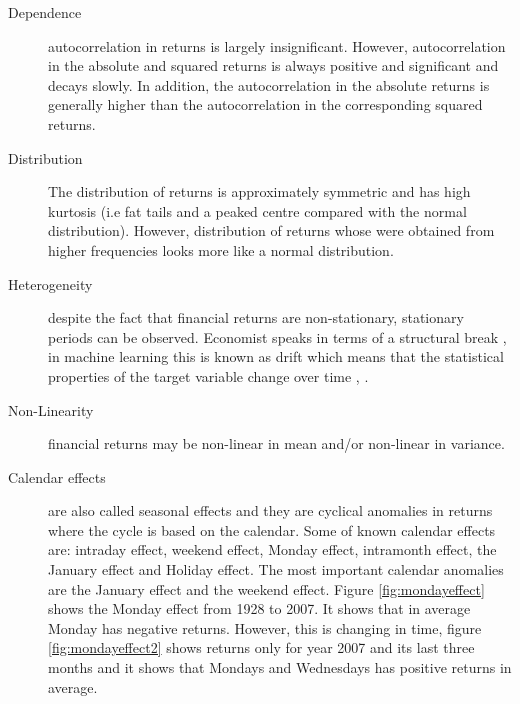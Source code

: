 \begin{description}
\item[Dependence] autocorrelation in returns is largely insignificant. However,
autocorrelation in the absolute and squared returns is always positive and
significant and decays slowly. In addition, the autocorrelation in the absolute
returns is generally higher than the autocorrelation in the corresponding
squared returns.
\item[Distribution] The distribution of returns is approximately symmetric and
has high kurtosis (i.e fat tails and a peaked centre compared with the normal
distribution). However, distribution of returns whose were obtained from higher
frequencies looks more like a normal distribution.
\item[Heterogeneity] despite the fact that financial returns are non-stationary,
stationary periods can be observed. Economist speaks in terms of a structural
break \cite{stock1994}, in machine learning this is known as drift which means
that the statistical properties of the target variable change over time
\cite{widmer1996}, \cite{tsymbal2004}.
\item[Non-Linearity] financial returns may be non-linear in mean and/or
non-linear in variance.
\item[Calendar effects] are also called seasonal effects and they are cyclical
anomalies in returns where the cycle is based on the calendar. Some of known
calendar effects are: intraday effect, weekend effect, Monday effect, intramonth
effect, the January effect and Holiday effect. The most important calendar
anomalies are the January effect and the weekend effect. Figure
\ref{fig:mondayeffect} shows the Monday effect from 1928 to 2007. It shows that
in average Monday has negative returns. However, this is changing in time,
figure \ref{fig:mondayeffect2} shows returns only for year 2007 and its last
three months and it shows that Mondays and Wednesdays has positive returns in
average.


\end{description}
